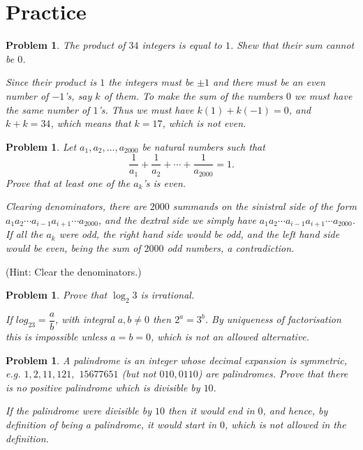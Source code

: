\documentclass[11pt, openany]{book}
\theoremstyle{change} \theoremheaderfont{\blue\sffamily\bfseries}
\newtheorem{pro}[thm]{Problem}
\theoremstyle{nonumberplain} \theoremheaderfont{\sffamily\bfseries}
\newcommand{\í}{\'{\i}}
\begin{document}
\section*{Practice}
\begin{pro}
The product of $34$ integers is equal to $1$. Shew that their sum
cannot be $0$.
\begin{answer}
Since their product is $1$ the integers must be $\pm 1$ and there
must be an even number of $-1$'s, say $k$ of them. To make the sum
of the numbers $0$ we must have the same number of $1$'s. Thus we
must have $k(1) + k(-1) = 0$, and $k+k = 34$, which means that
$k=17$, which is not even.
\end{answer}

\end{pro}
\begin{pro}
Let $a_1, a_2, \ldots , a_{2000}$ be natural numbers such that
$$\frac{1}{a_1} + \frac{1}{a_2} + \cdots + \frac{1}{a_{2000}} =
1.$$ Prove that at least one of the $a_k$'s is even.
\begin{answer}
Clearing denominators, there are $2000$ summands on the sinistral
side of the form $a_1a_2\cdots a_{i-1}a_{i+1}\cdots a_{2000}$, and
the dextral side we simply have $a_1a_2\cdots a_{i-1}a_{i+1}\cdots
a_{2000}$. If all the $a_k$ were odd, the right hand side would be
odd, and the left hand side would be even, being the sum of $2000$
odd numbers, a contradiction.
\end{answer}
\end{pro}(Hint: Clear  the denominators.)
\begin{pro}
Prove that $\log _2 3$ is irrational.
\begin{answer}
If $log_23 = \dfrac{a}{b}$, with integral $a, b\neq 0$ then $2^a =
3^b$. By uniqueness of factorisation this is impossible unless $a =
b = 0$, which is not an allowed alternative.
\end{answer}

\end{pro}
\begin{pro}
A {\em palindrome} is an integer whose decimal expansion is
symmetric, e.g. $1, 2, 11, 121,$ $15677651$ (but not $010, 0110$)
are palindromes. Prove that there is no positive palindrome which
is divisible by $10.$
\begin{answer}
If the palindrome were divisible by $10$ then it would end in $0$,
and hence, by definition of being a palindrome, it would start in
$0$, which is not allowed in the definition.
\end{answer}
\end{pro}
\end{document}
